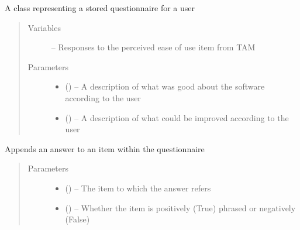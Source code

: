 \documentclass[letterpaper,10pt,english]{sphinxmanual}
\begin{document}
\begin{fulllineitems}
\label{\detokenize{questionnaire:questionnaire.Questionnaire}}
A class representing a stored questionnaire for a user
\begin{quote}\begin{description}
\item[{Variables}] \leavevmode
{} -- Responses to the perceived ease of use item from TAM

\item[{Parameters}] \leavevmode\begin{itemize}
\item {} 
 () -- A description of what was good about the software according to the user

\item {} 
 () -- A description of what could be improved according to the user

\end{itemize}

\end{description}\end{quote}

\begin{fulllineitems}
\label{\detokenize{questionnaire:questionnaire.Questionnaire.append_answer}}
Appends an answer to an item within the questionnaire
\begin{quote}\begin{description}
\item[{Parameters}] \leavevmode\begin{itemize}
\item {} 
 ({\hyperref[\detokenize{questionnaire_item:questionnaire_item.QuestionnaireItem}]{}}) -- The item to which the answer refers

\item {} 
 () -- Whether the item is positively (True) phrased or negatively (False)


\end{itemize}
\end{description}
\end{quote}
\end{fulllineitems}
\end{fulllineitems}
\end{document}
